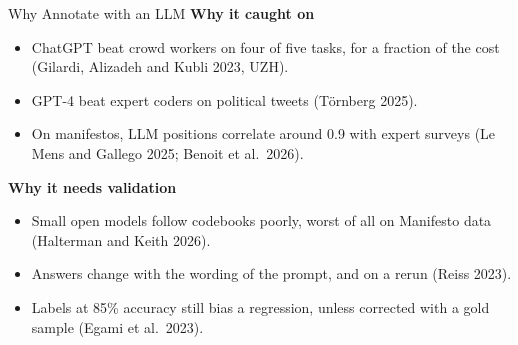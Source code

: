 \documentclass[svgnames,x11names,dvipsnames]{beamer}
\begin{document}
\begin{frame}{Why Annotate with an LLM}
\small
\textbf{Why it caught on}
\begin{itemize}
    \setlength{\itemsep}{2pt}
    \item ChatGPT beat crowd workers on four of five tasks, for a fraction of the cost (Gilardi, Alizadeh and Kubli 2023, UZH).
    \item GPT-4 beat expert coders on political tweets (T\"ornberg 2025).
    \item On manifestos, LLM positions correlate around 0.9 with expert surveys (Le Mens and Gallego 2025; Benoit et al.\ 2026).
\end{itemize}

\vspace{0.3cm}
\textbf{Why it needs validation}
\begin{itemize}
    \setlength{\itemsep}{2pt}
    \item Small open models follow codebooks poorly, worst of all on Manifesto data (Halterman and Keith 2026).
    \item Answers change with the wording of the prompt, and on a rerun (Reiss 2023).
    \item Labels at 85\% accuracy still bias a regression, unless corrected with a gold sample (Egami et al.\ 2023).
\end{itemize}
\end{frame}
\end{document}
